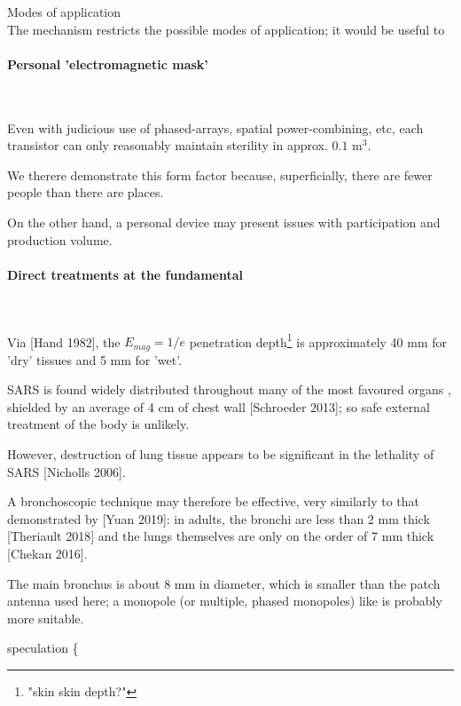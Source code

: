 \documentclass[fleqn,10pt]{article}
\begin{document}
\clearpage
\begin{multicols}{1}
{\Large Modes of application}\\

The mechanism restricts the possible modes of application; it would be useful to 

\paragraph{\textbf{Personal 'electromagnetic mask'}}\

Even with judicious use of phased-arrays, spatial power-combining, etc, each transistor can only reasonably maintain sterility in approx. $ 0.1 \text{ m}^3 $.

We therere demonstrate this form factor because, superficially, there are fewer people than there are places. 

On the other hand, a personal device may present issues with participation and production volume. 

\paragraph{\textbf{Direct treatments at the fundamental}}\

Via [Hand 1982], the $E_{mag}=1/e$ penetration depth\footnote{"skin skin depth?"} is approximately 40 mm for 'dry' tissues and 5 mm for 'wet'. 



SARS is found widely distributed throughout many of the most favoured organs \cite{Organ2004}, shielded by an average of 4 cm of chest wall [Schroeder 2013]; so safe external treatment of the body is unlikely.

However, destruction of lung tissue appears to be significant in the lethality of SARS [Nicholls 2006]. 

A bronchoscopic technique may therefore be effective, very similarly to that demonstrated by [Yuan 2019]: in adults, the bronchi are less than 2 mm thick [Theriault 2018] and the lungs themselves are only on the order of 7 mm thick [Chekan 2016]. 

The main bronchus is about 8 mm in diameter, which is smaller than the patch antenna used here; a monopole (or multiple, phased monopoles) like is probably more suitable.

{\color{red} speculation \{ } 


\end{multicols}
\end{document}
